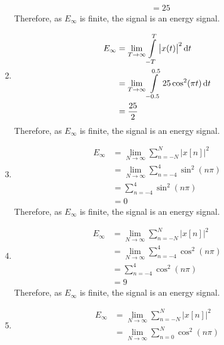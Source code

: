 \documentclass[fleqn, a4paper, 11pt, oneside]{amsart}
\theoremstyle{definition}
\theoremstyle{theorem}
\begin{document}
\begin{solution}
\begin{enumerate}[leftmargin=*]
\begin{align*}
                                           & = 25
			\end{align*}
			Therefore, as $E_{\infty}$ is finite, the signal is an energy signal.
		\item
			\begin{align*}
				E_{\infty} & = \lim\limits_{T \to \infty} \int\limits_{-T}^{T} \left| x(t) \right|^2 \dif t \\
                                           & = \lim\limits_{T \to \infty} \int\limits_{-0.5}^{0.5} 25 \cos^2(\pi t) \dif t  \\
                                           & = \frac{25}{2}
			\end{align*}
			Therefore, as $E_{\infty}$ is finite, the signal is an energy signal.
		\item
			\begin{align*}
				E_{\infty} & = \lim\limits_{N \to \infty} \sum\limits_{n = -N}^{N} \left| x[n] \right|^2 \\
                                           & = \lim\limits_{N \to \infty} \sum\limits_{n = -4}^{4} \sin^2(n \pi)         \\
                                           & = \sum\limits_{n = -4}^{4} \sin^2(n \pi)                                    \\
                                           & = 0
			\end{align*}
			Therefore, as $E_{\infty}$ is finite, the signal is an energy signal.
		\item
			\begin{align*}
				E_{\infty} & = \lim\limits_{N \to \infty} \sum\limits_{n = -N}^{N} \left| x[n] \right|^2 \\
                                           & = \lim\limits_{N \to \infty} \sum\limits_{n = -4}^{4} \cos^2(n \pi)         \\
                                           & = \sum\limits_{n = -4}^{4} \cos^2(n \pi)                                    \\
                                           & = 9
			\end{align*}
			Therefore, as $E_{\infty}$ is finite, the signal is an energy signal.
		\item
			\begin{align*}
				E_{\infty} & = \lim\limits_{N \to \infty} \sum\limits_{n = -N}^{N} \left| x[n] \right|^2 \\
                                           & = \lim\limits_{N \to \infty} \sum\limits_{n = 0}^{N} \cos^2(n \pi)          \\

\end{align*}
\end{enumerate}
\end{solution}
\end{document}
